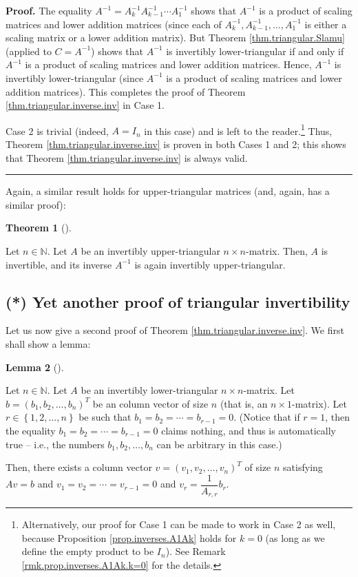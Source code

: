\documentclass[numbers=enddot,12pt,final,onecolumn,notitlepage]{scrartcl}%
\theoremstyle{definition}
\newtheorem{theo}{Theorem}[section]
\newenvironment{theorem}[1][]
{\begin{theo}[#1]\begin{leftbar}}
{\end{leftbar}\end{theo}}
\newtheorem{lem}[theo]{Lemma}
\newenvironment{lemma}[1][]
{\begin{lem}[#1]\begin{leftbar}}
{\end{leftbar}\end{lem}}
\newenvironment{proof}[1][Proof]{\noindent\textbf{#1.} }{\ \rule{0.5em}{0.5em}}
\begin{document}
\begin{proof}
The equality $A^{-1}=A_{k}^{-1}A_{k-1}^{-1}\cdots A_{1}^{-1}$ shows that
$A^{-1}$ is a product of scaling matrices and lower addition matrices (since
each of $A_{k}^{-1},A_{k-1}^{-1},\ldots,A_{1}^{-1}$ is either a scaling matrix
or a lower addition matrix). But Theorem \ref{thm.triangular.Slamu} (applied
to $C=A^{-1}$) shows that $A^{-1}$ is invertibly lower-triangular if and only
if $A^{-1}$ is a product of scaling matrices and lower addition matrices.
Hence, $A^{-1}$ is invertibly lower-triangular (since $A^{-1}$ is a product of
scaling matrices and lower addition matrices). This completes the proof of
Theorem \ref{thm.triangular.inverse.inv} in Case 1.

Case 2 is trivial (indeed, $A=I_{n}$ in this case) and is left to the
reader.\footnote{Alternatively, our proof for Case 1 can be made to work in
Case 2 as well, because Proposition \ref{prop.inverses.A1Ak} holds for $k=0$
(as long as we define the empty product to be $I_{n}$). See Remark
\ref{rmk.prop.inverses.A1Ak.k=0} for the details.} Thus, Theorem
\ref{thm.triangular.inverse.inv} is proven in both Cases 1 and 2; this shows
that Theorem \ref{thm.triangular.inverse.inv} is always valid.
\end{proof}

Again, a similar result holds for upper-triangular matrices (and, again, has a
similar proof):

\begin{theorem}
\label{thm.triangular.inverse-up.inv}Let $n\in\mathbb{N}$. Let $A$ be an
invertibly upper-triangular $n\times n$-matrix. Then, $A$ is invertible, and
its inverse $A^{-1}$ is again invertibly upper-triangular.
\end{theorem}

\subsection{(*) Yet another proof of triangular invertibility}

Let us now give a second proof of Theorem \ref{thm.triangular.inverse.inv}. We
first shall show a lemma:

\begin{lemma}
\label{lem.triangular.inverse.inv.3rd.1}Let $n\in\mathbb{N}$. Let $A$ be an
invertibly lower-triangular $n\times n$-matrix. Let $b=\left(  b_{1}%
,b_{2},\ldots,b_{n}\right)  ^{T}$ be an column vector of size $n$ (that is, an
$n\times1$-matrix). Let $r\in\left\{  1,2,\ldots,n\right\}  $ be such that
$b_{1}=b_{2}=\cdots=b_{r-1}=0$. (Notice that if $r=1$, then the equality
$b_{1}=b_{2}=\cdots=b_{r-1}=0$ claims nothing, and thus is automatically true
-- i.e., the numbers $b_{1},b_{2},\ldots,b_{n}$ can be arbitrary in this case.)

Then, there exists a column vector $v=\left(  v_{1},v_{2},\ldots,v_{n}\right)
^{T}$ of size $n$ satisfying $Av=b$ and $v_{1}=v_{2}=\cdots=v_{r-1}=0$ and
$v_{r}=\dfrac{1}{A_{r,r}}b_{r}$.
\end{lemma}
\end{document}
